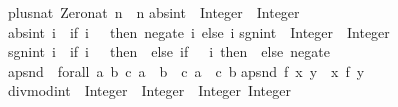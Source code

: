 \begin{isabellebody}
\begin{isamarkuptext}
plus{}nat\ Zero{}nat\ n\ {}\ n{}\isanewline
\isanewline
abs{}int\ {}{}\ Integer\ {}{}\ Integer{}\isanewline
abs{}int\ i\ {}\ {}if\ i\ {}\ {}\ then\ negate\ i\ else\ i{}{}\isanewline
\isanewline
sgn{}int\ {}{}\ Integer\ {}{}\ Integer{}\isanewline
sgn{}int\ i\ {}\ {}if\ i\ {}{}\ {}\ then\ {}\ else\ {}if\ {}\ {}\ i\ then\ {}\ else\ negate\ {}{}{}{}\isanewline
\isanewline
apsnd\ {}{}\ forall\ a\ b\ c{}\ {}a\ {}{}\ b{}\ {}{}\ {}c{}\ a{}\ {}{}\ {}c{}\ b{}{}\isanewline
apsnd\ f\ {}x{}\ y{}\ {}\ {}x{}\ f\ y{}{}\isanewline
\isanewline
divmod{}int\ {}{}\ Integer\ {}{}\ Integer\ {}{}\ {}Integer{}\ Integer{}{}\isanewline

\end{isamarkuptext}
\end{isabellebody}
